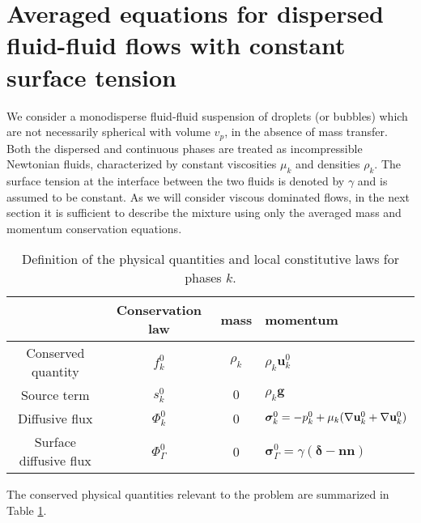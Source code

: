 \section{Averaged equations for dispersed fluid-fluid flows with constant surface tension}%



We consider a monodisperse fluid-fluid suspension of droplets (or bubbles) which are not necessarily spherical with volume \( v_p \), in the absence of mass transfer. 
Both the dispersed and continuous phases are treated as incompressible Newtonian fluids, characterized by constant viscosities \( \mu_k \) and densities \( \rho_k \). 
The surface tension at the interface between the two fluids is denoted by \( \gamma \) and is assumed to be constant. 
As we will consider viscous dominated flows, in the next section it is sufficient to describe the mixture using only the averaged mass and momentum conservation equations.
\begin{table}
    \centering
    \begin{tabular}{|c|ccl|}\hline
    & Conservation law & mass & momentum \\ \hline
    Conserved quantity & $f_k^0$  & $\rho_k$ & $\rho_k \textbf{u}_k^0$ \\
    Source term & $s_k^0$  & $0$ & $\rho_k \textbf{g}$ \\
    Diffusive flux & $\Phi_k^0$ & 0 & $\bm\sigma_k^0 = -p_k^0 + \mu_k (\mathbf{\nabla} \textbf{u}_k^0 + \mathbf{\nabla} \textbf{u}_k^0)$ \\
    Surface diffusive flux & $\Phi_\Gamma^0$ & 0 & $\bm\sigma_\Gamma^0 = \gamma (\bm\delta - \textbf{nn})$ \\\hline
    \end{tabular}

    \caption{Definition of the physical quantities and local constitutive laws for phases $k$.}
    \label{tab:qte_Newtonian}
\end{table}
The conserved physical quantities  relevant to the problem are summarized in Table \ref{tab:qte_Newtonian}.


